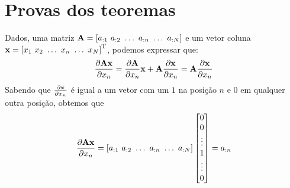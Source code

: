 \section{Provas dos teoremas}

\begin{myproofT}\label{proof:theo:derAx}
Dados,
uma matriz $\MATRIX{A}=\left[a_{:1}~ a_{:2}~ \hdots~ a_{:n}~ \hdots~ a_{:N}\right]$ e 
um vetor coluna $\VECTOR{x}=\left[x_{1}~ x_{2}~ \hdots~ x_{n}~ \hdots~ x_{N}\right]^{\transpose}$, 
podemos expressar que:
\begin{equation}
\frac{\partial \MATRIX{A}\VECTOR{x}}{\partial x_n}=
\frac{\partial \MATRIX{A}}{\partial x_n}\VECTOR{x}+\MATRIX{A}\frac{\partial \VECTOR{x}}{\partial x_n}=
\MATRIX{A}\frac{\partial \VECTOR{x}}{\partial x_n}
\end{equation}
Sabendo que $\frac{\partial \VECTOR{x}}{\partial x_n}$ é igual a um vetor 
com um $1$ na posição $n$ e $0$ em qualquer outra posição, obtemos que
\begin{equation}
\frac{\partial \MATRIX{A}\VECTOR{x}}{\partial x_n}=
\left[a_{:1}~ a_{:2}~ \hdots~ a_{:n}~ \hdots~ a_{:N}\right]\left[
\begin{matrix}
 0\\
 0\\
 \vdots\\
 1\\
 \vdots\\
 0
\end{matrix}
\right]=a_{:n}
\end{equation}
\end{myproofT}

